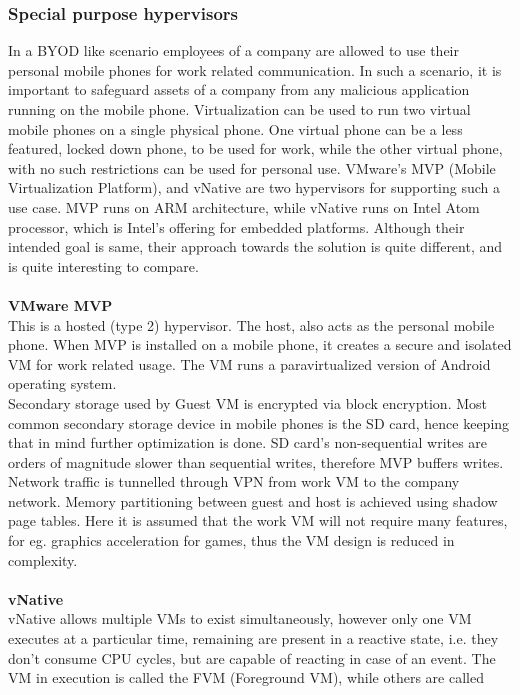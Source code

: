 \documentclass[a4paper,10pt]{article}
\begin{document}
  \subsubsection{Special purpose hypervisors}
  In a BYOD like scenario employees of a company are allowed to use their personal mobile phones for work related communication. In such a scenario, it is important
  to safeguard assets of a company from any malicious application running on the mobile phone. Virtualization can be used to run two virtual mobile phones
  on a single physical phone. One virtual phone can be a less featured, locked down phone, to be used for work, while the other virtual phone, with no such restrictions
  can be used for personal use. VMware's MVP (Mobile Virtualization Platform)\cite{Barr:2010:VMV:1899928.1899945}, and vNative\cite{7006388} are two hypervisors
  for supporting such a use case. 
  MVP runs on ARM architecture, while vNative runs on Intel Atom processor, which is Intel's offering for embedded platforms.
  Although their intended goal is same, their approach towards the solution is quite different, and is quite interesting to compare.
  \\\\
  \textbf{VMware MVP}
  \\
  This is a hosted (type 2) hypervisor. The host, also acts as the personal mobile phone. When MVP is installed on a mobile phone, it creates a secure and isolated VM for work related usage.
  The VM runs a paravirtualized version of Android operating system.\\
  Secondary storage used by Guest VM is encrypted via block encryption. Most common secondary storage device in mobile phones is the SD card, hence keeping that 
  in mind further optimization is done. SD card's non-sequential writes are orders of magnitude slower than sequential writes, therefore MVP buffers writes.
  Network traffic is tunnelled through VPN from work VM to the company network. Memory partitioning between guest and host is achieved using shadow page tables.
  Here it is assumed that the work VM will not require many features, for eg. graphics acceleration for games, thus the VM design is reduced in complexity.
  \\\\
  \textbf{vNative}
  \\
  vNative allows multiple VMs to exist simultaneously, however only one VM executes at a particular time, remaining are present in a reactive state, i.e. they 
  don't consume CPU cycles, but are capable of reacting in case of an event. The VM in execution is called the FVM (Foreground VM), while others are called
\end{document}
